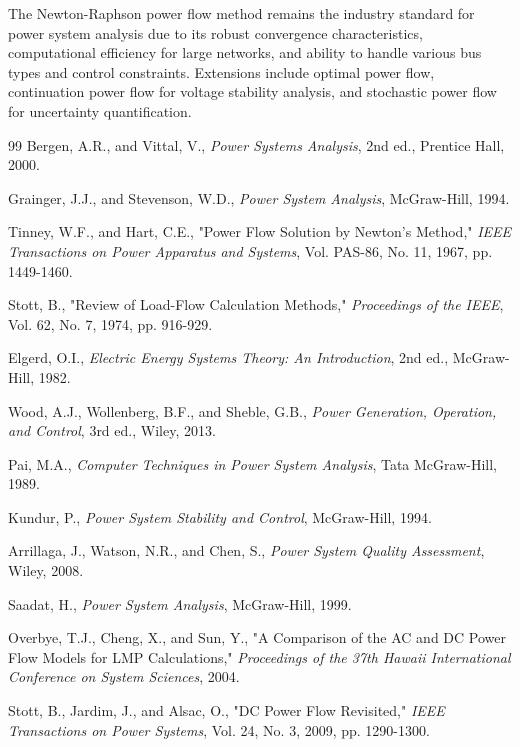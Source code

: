 \documentclass[11pt,a4paper]{article}
\begin{document}
The Newton-Raphson power flow method remains the industry standard for power system analysis due to its robust convergence characteristics, computational efficiency for large networks, and ability to handle various bus types and control constraints. Extensions include optimal power flow, continuation power flow for voltage stability analysis, and stochastic power flow for uncertainty quantification.

\begin{thebibliography}{99}
 Bergen, A.R., and Vittal, V., \textit{Power Systems Analysis}, 2nd ed., Prentice Hall, 2000.

 Grainger, J.J., and Stevenson, W.D., \textit{Power System Analysis}, McGraw-Hill, 1994.

 Tinney, W.F., and Hart, C.E., "Power Flow Solution by Newton's Method," \textit{IEEE Transactions on Power Apparatus and Systems}, Vol. PAS-86, No. 11, 1967, pp. 1449-1460.

 Stott, B., "Review of Load-Flow Calculation Methods," \textit{Proceedings of the IEEE}, Vol. 62, No. 7, 1974, pp. 916-929.

 Elgerd, O.I., \textit{Electric Energy Systems Theory: An Introduction}, 2nd ed., McGraw-Hill, 1982.

 Wood, A.J., Wollenberg, B.F., and Sheble, G.B., \textit{Power Generation, Operation, and Control}, 3rd ed., Wiley, 2013.

 Pai, M.A., \textit{Computer Techniques in Power System Analysis}, Tata McGraw-Hill, 1989.

 Kundur, P., \textit{Power System Stability and Control}, McGraw-Hill, 1994.

 Arrillaga, J., Watson, N.R., and Chen, S., \textit{Power System Quality Assessment}, Wiley, 2008.

 Saadat, H., \textit{Power System Analysis}, McGraw-Hill, 1999.

 Overbye, T.J., Cheng, X., and Sun, Y., "A Comparison of the AC and DC Power Flow Models for LMP Calculations," \textit{Proceedings of the 37th Hawaii International Conference on System Sciences}, 2004.

 Stott, B., Jardim, J., and Alsac, O., "DC Power Flow Revisited," \textit{IEEE Transactions on Power Systems}, Vol. 24, No. 3, 2009, pp. 1290-1300.


\end{thebibliography}
\end{document}
